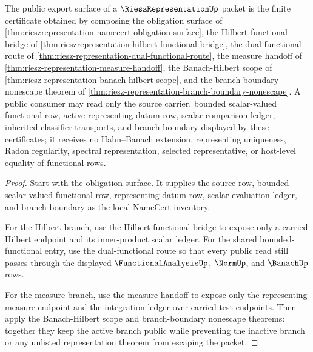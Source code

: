 \begin{theorem}
\label{thm:rieszrepresentation-public-export}
The public export surface of a $\RieszRepresentationUp$ packet is the finite certificate obtained by composing the obligation surface of \autoref{thm:rieszrepresentation-namecert-obligation-surface}, the Hilbert functional bridge of \autoref{thm:rieszrepresentation-hilbert-functional-bridge}, the dual-functional route of \autoref{thm:riesz-representation-dual-functional-route}, the measure handoff of \autoref{thm:riesz-representation-measure-handoff}, the Banach-Hilbert scope of \autoref{thm:riesz-representation-banach-hilbert-scope}, and the branch-boundary nonescape theorem of \autoref{thm:riesz-representation-branch-boundary-nonescape}. A public consumer may read only the source carrier, bounded scalar-valued functional row, active representing datum row, scalar comparison ledger, inherited classifier transports, and branch boundary displayed by these certificates; it receives no Hahn--Banach extension, representing uniqueness, Radon regularity, spectral representation, selected representative, or host-level equality of functional rows.
\end{theorem}
\begin{proof}
Start with the obligation surface. It supplies the source row, bounded scalar-valued functional row, representing datum row, scalar evaluation ledger, and branch boundary as the local NameCert inventory.

For the Hilbert branch, use the Hilbert functional bridge to expose only a carried Hilbert endpoint and its inner-product scalar ledger. For the shared bounded-functional entry, use the dual-functional route so that every public read still passes through the displayed $\FunctionalAnalysisUp$, $\NormUp$, and $\BanachUp$ rows.

For the measure branch, use the measure handoff to expose only the representing measure endpoint and the integration ledger over carried test endpoints. Then apply the Banach-Hilbert scope and branch-boundary nonescape theorems: together they keep the active branch public while preventing the inactive branch or any unlisted representation theorem from escaping the packet.
\end{proof}

